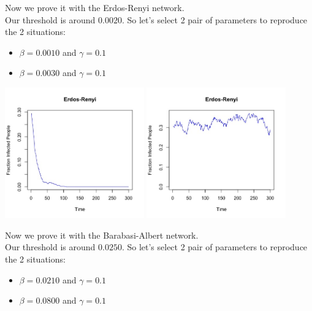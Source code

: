 \documentclass{article}
\begin{document}
\noindent Now we prove it with the Erdos-Renyi network.\\

\noindent Our threshold is around $0.0020$. So let's select 2 pair of parameters to reproduce the 2 situations:\\

\begin{itemize}
  \item $\beta = 0.0010$ and $\gamma = 0.1$
  \item $\beta = 0.0030$ and $\gamma = 0.1$\\
\end{itemize}


\begin{center}
   
    
    \includegraphics[width=6cm]{erdos_renyi_small.jpeg}
    \includegraphics[width=6cm]{erdos_renyi_big.jpeg}
    
    
\end{center}

\newpage
\noindent Now we prove it with the Barabasi-Albert network.\\

\noindent Our threshold is around $0.0250$. So let's select 2 pair of parameters to reproduce the 2 situations:\\

\begin{itemize}
  \item $\beta = 0.0210$ and $\gamma = 0.1$
  \item $\beta = 0.0800$ and $\gamma = 0.1$\\
\end{itemize}
\end{document}
